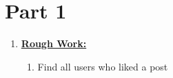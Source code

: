 \documentclass[12pt]{article}
\begin{document}
\section*{Part 1}

\begin{enumerate}[1.]
    \item

    \bigskip

    \underline{\textbf{Rough Work:}}

    \bigskip

    \begin{enumerate}[1.]
        \item Find all users who liked a post

        \begin{mdframed}

        \end{mdframed}
    \end{enumerate}

\end{enumerate}
\end{document}

